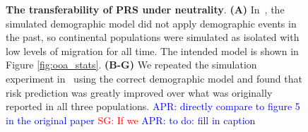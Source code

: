 \documentclass{article}
\newcommand{\aprcomment}[1]{{\textcolor{blue}{APR: #1}}}
\newcommand{\sgcomment}[1]{{\textcolor{red}{SG: #1}}}
\begin{document}
\begin{figure}[ht]
\begin{center}
\caption{\textbf{The transferability of PRS under neutrality}.
    \textbf{(A)} In~\citet{martin2017human}, the simulated demographic model did not apply demographic
    events in the past, so continental populations were simulated as isolated with low levels of migration
    for all time. The intended model is shown in Figure \ref{fig:ooa_stats}.
    \textbf{(B-G)} We repeated the simulation experiment in~\cite{martin2017human} using the correct
    demographic model and found that risk prediction was greatly improved over what was originally
    reported in all three populations.
    \aprcomment{directly compare to figure 5 in the original paper} \sgcomment{If we }
    \aprcomment{to do: fill in caption}
}
\label{fig:prs}
\end{center}
\end{figure}
\end{document}
